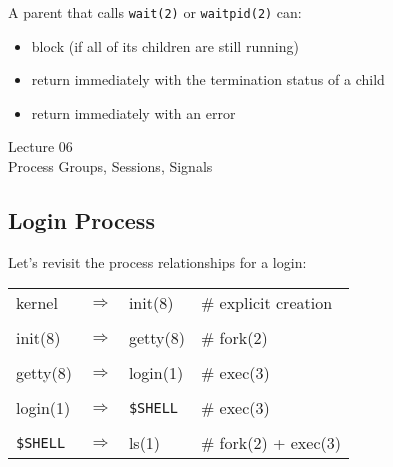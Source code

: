 \documentclass[xga]{xdvislides}
\begin{document}
A parent that calls {\tt wait(2)} or {\tt waitpid(2)} can:

\begin{itemize}
	\item block (if all of its children are still running)
	\item return immediately with the termination status of a child
	\item return immediately with an error
\end{itemize}

\newpage
\vspace*{\fill}
\begin{center}
  \Hugesize
    Lecture 06
	\hspace*{5mm}\blueline\\ [1em]
	Process Groups, Sessions, Signals
  \Normalsize
\end{center}
\vspace*{\fill}

\subsection{Login Process}
Let's revisit the process relationships for a login:
\vspace*{\fill}
\begin{center}
\begin{tabular}[width=.75\texwidth]{l c l l }
kernel & $\Rightarrow$ & init(8) & \# explicit creation \\
\\
init(8) & $\Rightarrow$ & getty(8) & \# fork(2) \\
\\
getty(8) & $\Rightarrow$ & login(1) & \# exec(3) \\
\\
login(1) & $\Rightarrow$ & \verb+$SHELL+ & \# exec(3) \\
\\
\verb+$SHELL+ & $\Rightarrow$ & ls(1) & \# fork(2) + exec(3) \\
\end{tabular}
\end{center}
\vspace*{\fill}
\end{document}
